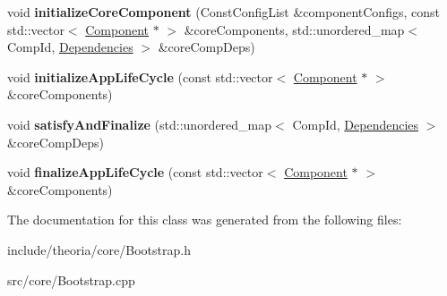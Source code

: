 \begin{DoxyCompactItemize}
\item 
\hypertarget{classtheoria_1_1core_1_1Bootstrap_a51bc7679b53aeb2e3ca45cc2fe472eab}{void {\bfseries initialize\+Core\+Component} (Const\+Config\+List \&component\+Configs, const std\+::vector$<$ \hyperlink{classtheoria_1_1core_1_1Component}{Component} $\ast$ $>$ \&core\+Components, std\+::unordered\+\_\+map$<$ Comp\+Id, \hyperlink{classtheoria_1_1core_1_1Dependencies}{Dependencies} $>$ \&core\+Comp\+Deps)}\label{classtheoria_1_1core_1_1Bootstrap_a51bc7679b53aeb2e3ca45cc2fe472eab}

\item 
\hypertarget{classtheoria_1_1core_1_1Bootstrap_a46ddfd13c2fc647a3bfaa70d00086de8}{void {\bfseries initialize\+App\+Life\+Cycle} (const std\+::vector$<$ \hyperlink{classtheoria_1_1core_1_1Component}{Component} $\ast$ $>$ \&core\+Components)}\label{classtheoria_1_1core_1_1Bootstrap_a46ddfd13c2fc647a3bfaa70d00086de8}

\item 
\hypertarget{classtheoria_1_1core_1_1Bootstrap_a863bc8162f5e60cd6520f81b8809b9c1}{void {\bfseries satisfy\+And\+Finalize} (std\+::unordered\+\_\+map$<$ Comp\+Id, \hyperlink{classtheoria_1_1core_1_1Dependencies}{Dependencies} $>$ \&core\+Comp\+Deps)}\label{classtheoria_1_1core_1_1Bootstrap_a863bc8162f5e60cd6520f81b8809b9c1}

\item 
\hypertarget{classtheoria_1_1core_1_1Bootstrap_a422ffaefb77c5c8805e0b8ca1407613a}{void {\bfseries finalize\+App\+Life\+Cycle} (const std\+::vector$<$ \hyperlink{classtheoria_1_1core_1_1Component}{Component} $\ast$ $>$ \&core\+Components)}\label{classtheoria_1_1core_1_1Bootstrap_a422ffaefb77c5c8805e0b8ca1407613a}

\end{DoxyCompactItemize}


The documentation for this class was generated from the following files\+:\begin{DoxyCompactItemize}
\item 
include/theoria/core/Bootstrap.\+h\item 
src/core/Bootstrap.\+cpp\end{DoxyCompactItemize}
